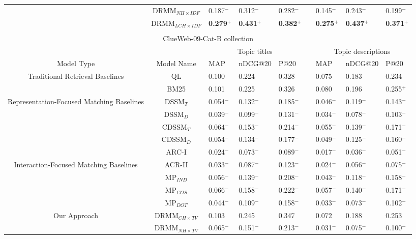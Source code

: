 \documentclass{sig-alternate-05-2015}
\begin{document}
\begin{table*}[!ht]
\begin{tabular}{c c l l l l l l l}
    &DRMM$_{NH\times IDF}$ & 0.187$^-$ & 0.312$^-$ & 0.282$^-$ & & 0.145$^-$ & 0.243$^-$ & 0.199$^-$ \\
    &DRMM$_{LCH\times IDF}$ & \textbf{0.279}$^+$ & \textbf{0.431}$^+$ & \textbf{0.382}$^+$ & & \textbf{0.275}$^+$ & \textbf{0.437}$^+$ & \textbf{0.371}$^+$  \\\hline\hline\\
     \multicolumn{9}{c}{ClueWeb-09-Cat-B collection} \\
  \hline \hline
    & & \multicolumn{3}{c}{Topic titles} & & \multicolumn{3}{c}{Topic descriptions} \\\cline{3-5}\cline{7-9}
    Model Type & Model Name & MAP & nDCG@20 & P@20  & & MAP & nDCG@20 & P@20 \\\hline
    \multirow{2}{3cm}{\centering Traditional Retrieval Baselines}& QL & 0.100 & 0.224 & 0.328  & & 0.075 & 0.183 & 0.234 \\
    & BM25 & 0.101 & 0.225 & 0.326 & & 0.080 & 0.196 & 0.255$^+$  \\\hline
    \multirow{5}{3.4cm}{\centering Representation-Focused Matching Baselines}& DSSM$_T$ & 0.054$^-$ & 0.132$^-$ & 0.185$^-$ &  &0.046$^-$ & 0.119$^-$ & 0.143$^-$  \\
    & DSSM$_D$ & 0.039$^-$ & 0.099$^-$ & 0.131$^-$ & & 0.034$^-$ & 0.078$^-$ & 0.103$^-$ \\
    & CDSSM$_T$ & 0.064$^-$ & 0.153$^-$ & 0.214$^-$ & & 0.055$^-$ & 0.139$^-$ & 0.171$^-$ \\
    & CDSSM$_D$ & 0.054$^-$ & 0.134$^-$ & 0.177$^-$ & & 0.049$^-$ & 0.125$^-$ & 0.160$^-$ \\
    & ARC-I & 0.024$^-$ & 0.073$^-$ & 0.089$^-$ & & 0.017$^-$ & 0.036$^-$ & 0.051$^-$\\\hline
    \multirow{4}{3cm}{\centering Interaction-Focused Matching Baselines}& ACR-II & 0.033$^-$ & 0.087$^-$ & 0.123$^-$ &  & 0.024$^-$ & 0.056$^-$ & 0.075$^-$ \\
    & MP$_{IND}$ &  0.056$^-$ & 0.139$^-$ & 0.208$^-$ & & 0.043$^-$ & 0.118$^-$ & 0.158$^-$ \\
    & MP$_{COS}$ & 0.066$^-$ & 0.158$^-$ & 0.222$^-$ & & 0.057$^-$ & 0.140$^-$ & 0.171$^-$ \\
    & MP$_{DOT}$ & 0.044$^-$ & 0.109$^-$ & 0.158$^-$ & & 0.033$^-$ & 0.073$^-$ & 0.102$^-$ \\\hline
    \multirow{6}{3cm}{\centering Our Approach} & DRMM$_{CH\times TV}$ & 0.103 & 0.245 & 0.347 & & 0.072 & 0.188 & 0.253\\
    &DRMM$_{NH\times TV}$ & 0.065$^-$ & 0.151$^-$ & 0.213$^-$ & & 0.031$^-$ & 0.075$^-$ & 0.100$^-$\\

\end{tabular}
\end{table*}
\end{document}
